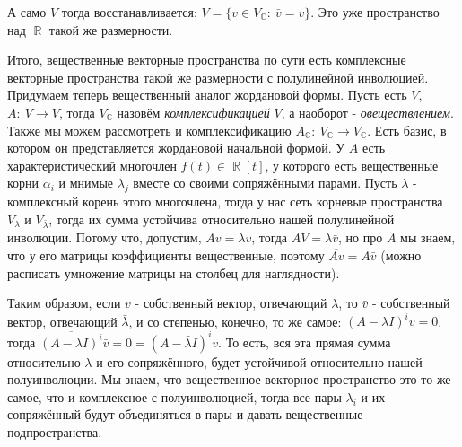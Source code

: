 \documentclass[a4paper,100pt]{article}
\theoremstyle{indented}
\theoremstyle{definition}
\theoremstyle{remark}
\DeclareMathOperator{\CC}{\mathbb{C}}
\DeclareMathOperator{\RR}{\mathbb{R}}
\begin{document}
А само $V$ тогда восстанавливается: $V=\{v\in V_{\CC}: \: \bar{v}=v\}$. Это уже пространство над $\RR$ такой же размерности. \ 

Итого, вещественные векторные пространства по сути есть комплексные векторные пространства такой же размерности с полулинейной инволюцией. Придумаем теперь вещественный аналог жордановой формы. Пусть есть $V$, $A: \: V\rightarrow V$, тогда $V_{\CC}$ назовём \textit{комплексификацией} $V$, а наоборот - \textit{овеществлением}. Также мы можем рассмотреть и комплексификацию $A_{\CC}: \: V_{\CC}\rightarrow V_{\CC}$. Есть базис, в котором он представляется жордановой начальной формой. У $A$ есть характеристический многочлен $f(t)\in \RR[t]$, у которого есть вещественные корни $\alpha_i$ и мнимые $\lambda_j$ вместе со своими сопряжёнными парами. Пусть $\lambda$ - комплексный корень этого многочлена, тогда у нас сеть корневые пространства $V_{\lambda}$ и $V_{\bar{\lambda}}$, тогда их сумма устойчива относительно нашей полулинейной инволюции. Потому что, допустим, $Av=\lambda v$, тогда $\overline{AV}=\bar{\lambda\bar{v}}$, но про $A$ мы знаем, что у его матрицы коэффициенты вещественные, поэтому $\overline{Av}=A\bar{v}$ (можно расписать умножение матрицы на столбец для наглядности). \ 

Таким образом, если $v$ - собственный вектор, отвечающий $\lambda$, то $\bar{v}$ - собственный вектор, отвечающий $\bar{\lambda}$, и со степенью, конечно, то же самое: $(A-\lambda I)^iv=0$, тогда $\overline{(A-\lambda I)^i}\bar{v}=0=(A-\bar{\lambda} I)^iv$. То есть, вся эта прямая сумма относительно $\lambda$ и его сопряжённого, будет устойчивой относительно нашей полуинволюции. Мы знаем, что вещественное векторное пространство это то же самое, что и комплексное с полуинволюцией, тогда все пары $\lambda_i$ и их сопряжённый будут объединяться в пары и давать вещественные подпространства. 
\end{document}
